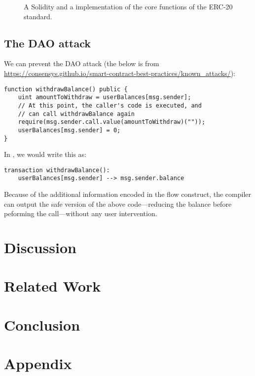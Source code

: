 \documentclass[sigconf]{acmart}
\begin{document}
\begin{figure*}[h]
    \centering
    \begin{minipage}[t]{0.5\textwidth}
        
    \end{minipage}%
    \begin{minipage}[t]{0.5\textwidth}
        
    \end{minipage}
    \caption{A Solidity and a \langName implementation of the core functions of the ERC-20 standard.}
    \label{fig:erc20-impl}
\end{figure*}

\subsection{The DAO attack}
We can prevent the DAO attack (the below is from \url{https://consensys.github.io/smart-contract-best-practices/known_attacks/}):
\begin{lstlisting}
function withdrawBalance() public {
    uint amountToWithdraw = userBalances[msg.sender];
    // At this point, the caller's code is executed, and
    // can call withdrawBalance again
    require(msg.sender.call.value(amountToWithdraw)(""));
    userBalances[msg.sender] = 0;
}
\end{lstlisting}

In \langName, we would write this as:

\begin{lstlisting}
transaction withdrawBalance():
    userBalances[msg.sender] --> msg.sender.balance
\end{lstlisting}

Because of the additional information encoded in the flow construct, the compiler can output the safe version of the above code---reducing the balance before peforming the call---without any user intervention.

\section{Discussion}

\section{Related Work}

\section{Conclusion}




\appendix

\section{Appendix}
\end{document}
